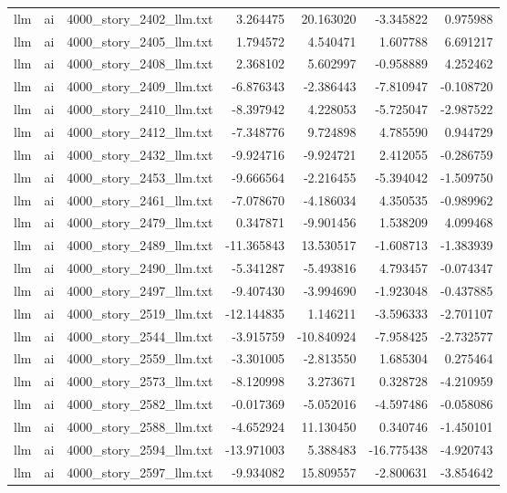 \begin{longtable}{lllrrrr}
llm & ai & 4000\_story\_2402\_llm.txt & 3.264475 & 20.163020 & -3.345822 & 0.975988 \\
llm & ai & 4000\_story\_2405\_llm.txt & 1.794572 & 4.540471 & 1.607788 & 6.691217 \\
llm & ai & 4000\_story\_2408\_llm.txt & 2.368102 & 5.602997 & -0.958889 & 4.252462 \\
llm & ai & 4000\_story\_2409\_llm.txt & -6.876343 & -2.386443 & -7.810947 & -0.108720 \\
llm & ai & 4000\_story\_2410\_llm.txt & -8.397942 & 4.228053 & -5.725047 & -2.987522 \\
llm & ai & 4000\_story\_2412\_llm.txt & -7.348776 & 9.724898 & 4.785590 & 0.944729 \\
llm & ai & 4000\_story\_2432\_llm.txt & -9.924716 & -9.924721 & 2.412055 & -0.286759 \\
llm & ai & 4000\_story\_2453\_llm.txt & -9.666564 & -2.216455 & -5.394042 & -1.509750 \\
llm & ai & 4000\_story\_2461\_llm.txt & -7.078670 & -4.186034 & 4.350535 & -0.989962 \\
llm & ai & 4000\_story\_2479\_llm.txt & 0.347871 & -9.901456 & 1.538209 & 4.099468 \\
llm & ai & 4000\_story\_2489\_llm.txt & -11.365843 & 13.530517 & -1.608713 & -1.383939 \\
llm & ai & 4000\_story\_2490\_llm.txt & -5.341287 & -5.493816 & 4.793457 & -0.074347 \\
llm & ai & 4000\_story\_2497\_llm.txt & -9.407430 & -3.994690 & -1.923048 & -0.437885 \\
llm & ai & 4000\_story\_2519\_llm.txt & -12.144835 & 1.146211 & -3.596333 & -2.701107 \\
llm & ai & 4000\_story\_2544\_llm.txt & -3.915759 & -10.840924 & -7.958425 & -2.732577 \\
llm & ai & 4000\_story\_2559\_llm.txt & -3.301005 & -2.813550 & 1.685304 & 0.275464 \\
llm & ai & 4000\_story\_2573\_llm.txt & -8.120998 & 3.273671 & 0.328728 & -4.210959 \\
llm & ai & 4000\_story\_2582\_llm.txt & -0.017369 & -5.052016 & -4.597486 & -0.058086 \\
llm & ai & 4000\_story\_2588\_llm.txt & -4.652924 & 11.130450 & 0.340746 & -1.450101 \\
llm & ai & 4000\_story\_2594\_llm.txt & -13.971003 & 5.388483 & -16.775438 & -4.920743 \\
llm & ai & 4000\_story\_2597\_llm.txt & -9.934082 & 15.809557 & -2.800631 & -3.854642 \\

\end{longtable}

